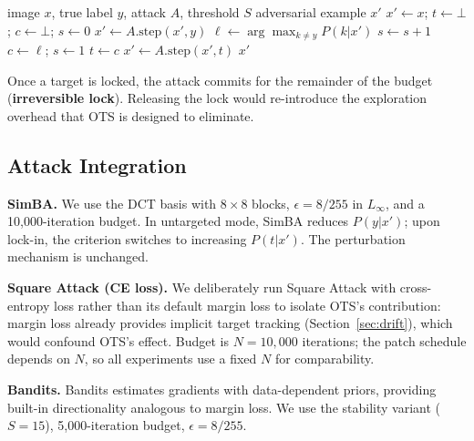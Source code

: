 \documentclass{cap2026}
\begin{document}
\begin{algorithm}[t]
\caption{Opportunistic Target Selection (Rank-Stability Variant)}
\label{alg:ot}
\begin{algorithmic}[1]
\Require image $x$, true label $y$, attack $A$, threshold $S$
\Ensure adversarial example $x'$
\State $x' \leftarrow x$;\; $t \leftarrow \bot$;\; $c \leftarrow \bot$;\; $s \leftarrow 0$
        \State $x' \leftarrow A.\text{step}(x', y)$
        \State $\ell \leftarrow \arg\max_{k \neq y} P(k|x')$
         $s \leftarrow s + 1$ \Else{} $c \leftarrow \ell$;\; $s \leftarrow 1$ \EndIf
         $t \leftarrow c$ \EndIf
    \Else
        \State $x' \leftarrow A.\text{step}(x', t)$
    \EndIf
\EndWhile
\State \Return $x'$
\end{algorithmic}
\end{algorithm}

Once a target is locked, the attack commits for the remainder of the budget (\textbf{irreversible lock}). Releasing the lock would re-introduce the exploration overhead that OTS is designed to eliminate.

\subsection{Attack Integration}\label{sec:integration}

\textbf{SimBA.} We use the DCT basis with $8\times8$ blocks, $\epsilon = 8/255$ in $L_\infty$, and a 10,000-iteration budget. In untargeted mode, SimBA reduces $P(y|x')$; upon lock-in, the criterion switches to increasing $P(t|x')$. The perturbation mechanism is unchanged.

\textbf{Square Attack (CE loss).} We deliberately run Square Attack with cross-entropy loss rather than its default margin loss to isolate OTS's contribution: margin loss already provides implicit target tracking (Section~\ref{sec:drift}), which would confound OTS's effect. Budget is $N = 10{,}000$ iterations; the patch schedule depends on $N$, so all experiments use a fixed $N$ for comparability.

\textbf{Bandits.} Bandits \citep{ilyas2019prior} estimates gradients with data-dependent priors, providing built-in directionality analogous to margin loss. We use the stability variant ($S = 15$), 5,000-iteration budget, $\epsilon = 8/255$.

\end{document}
